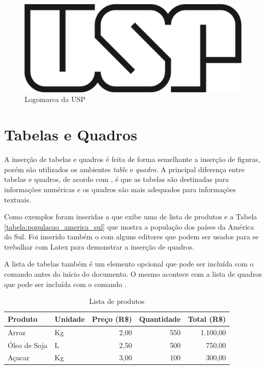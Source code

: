 \begin{figure}[htb]
 \caption{Logomarca da USP}
 \label{figura:logomarca_usp}
 \centering
 \includegraphics[scale=0.3]{images/usp-logo}
\end{figure}


\section{Tabelas e Quadros}
\label{secao:tabelas_e_quadros}

A inserção de tabelas e quadros é feita de forma semelhante a inserção de figuras, porém são utilizados os ambientes \textit{table} e \textit{quadro}. A principal diferença entre tabelas e quadros, de acordo com , é que as tabelas são destinadas para informações numéricas e os quadros são mais adequados para informações textuais.

 Como exemplos foram inseridas a  que exibe uma de lista de produtos e a Tabela \ref{tabela:populacao_america_sul} que mostra a população dos países da América do Sul. Foi inserido também o  com alguns editores que podem ser usados para se trebalhar com Latex para demonstrar a inserção de quadros.

 A lista de tabelas também é um elemento opcional que pode ser incluída com o comando  antes do início do documento. O mesmo acontece com a lista de quadros que pode ser incluída com o comando .

\begin{table}[htb]
\centering
\caption{Lista de produtos}
\label{tabela:lista_produtos}
\begin{tabularx}{\textwidth}{X|l|r|r|r} \hline
Produto      & Unidade & Preço (R\$) & Quantidade & Total (R\$) \\ \hline
Arroz        & Kg      & 2,00        & 550        & 1.100,00    \\
Óleo de Soja & L       & 2,50        & 500        & 750,00      \\
Açucar       & Kg      & 3,00        & 100        & 300,00      \\ \hline
\end{tabularx}
\end{table}

